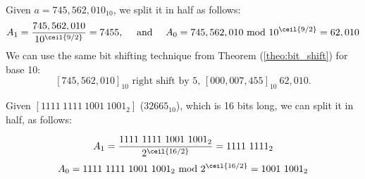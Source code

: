 \vspace{-1em}
\begin{Example}

\label{ex:split_base}

\vspace{-.5em}
Given $a=745,562,010_{10}$, we split it in half as follows:
\[ A_1=\frac{745,562,010}{10^{\ceil{9/2}}}=7455, \quad \text{ and } \quad A_0=745,562,010 \text{ mod } 10^{\ceil{9/2}}=62,010 \]
\noindent
We can use the same bit shifting technique from Theorem (\ref{theo:bit_shift}) for base 10:
$$[745,562,010]_{10} \text{ right shift by 5, } [000,007,455]_{10}\ 62,010.$$ 

\noindent
Given $[1111\ 1111\ 1001\ 1001_2]$ ($32665_{10}$), which is 16 bits long, we can split it in half, as follows:

\[ 
A_1=\frac{1111\ 1111\ 1001\ 1001_2}{2^{\ceil{16/2}}}=1111\ 1111_2
\]
\[A_0=1111\ 1111\ 1001\ 1001_2 \text{ mod } 2^{\ceil{16/2}}=1001\ 1001_2 \]

\vspace{-2em}
\end{Example}



\noindent


